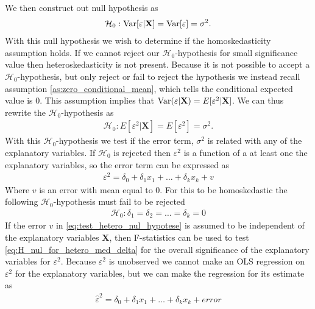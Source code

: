 We then construct out null hypothesis as
\begin{align*}
    \mathcal{H}_0 : \operatorname{\text{Var}}[\varepsilon | \mathbf{X}] = \operatorname{\text{Var}}[\varepsilon] = \sigma^2. 
\end{align*}
With this null hypothesis we wish to determine if the homoskedasticity assumption holds. If we cannot reject our $\mathcal{H}_0$-hypothesis for small significance value then heteroskedasticity is not present. Because it is not possible to accept a $\mathcal{H}_0$-hypothesis, but only reject or fail to reject the hypothesis we instead recall assumption \ref{as:zero_conditional_mean}, which tells the conditional expected value is $0$. This assumption implies that $\operatorname{\text{Var}}(\varepsilon | \mathbf{X}) = E[\varepsilon^2 | \mathbf{X}]$. We can thus rewrite the $\mathcal{H}_0$-hypothesis as
\begin{align*}
    \mathcal{H}_0 : E[\varepsilon^2 | \mathbf{X}] = E[\varepsilon^2] = \sigma^2.
\end{align*}
With this $\mathcal{H}_0$-hypothesis we test if the error term, $\sigma^2$ is related with any of the explanatory variables. 
If $\mathcal{H}_0$ is rejected then $\varepsilon^2$ is a function of a at least one the explanatory variables, so the error term can be expressed as
\begin{align}\label{eq:test_hetero_nul_hypotese}
    \varepsilon^2 = \delta_0 + \delta_1x_1 + \ldots + \delta_kx_k + v
\end{align}
Where $v$ is an error with mean equal to $0$. For this to be homoskedastic the following $\mathcal{H}_0$-hypothesis must fail to be rejected
\begin{align}\label{eq:H_nul_for_hetero_med_delta}
    \mathcal{H}_0 : \delta_1 = \delta_2 = \ldots = \delta_k = 0
\end{align}
If the error $v$ in \eqref{eq:test_hetero_nul_hypotese} is assumed to be independent of the explanatory variables $\mathbf{X}$, then F-statistics can be used to test \eqref{eq:H_nul_for_hetero_med_delta} for the overall significance of the explanatory variables for $\varepsilon^2$.
Because $\varepsilon^2$ is unobserved we cannot make an OLS regression on $\varepsilon^2$ for the explanatory variables, but we can make the regression for its estimate as
\begin{align*}
    \hat{\varepsilon}^2 = \delta_0 + \delta_1x_1 + \ldots + \delta_kx_k + error
\end{align*}





